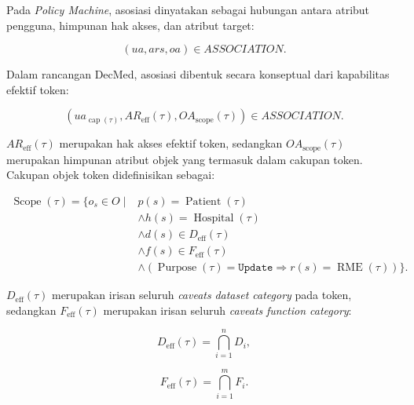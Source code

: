 \documentclass[bahasa, 12pt, a4paper, onecolumn, oneside, final]{report}
\begin{document}
Pada \textit{Policy Machine}, asosiasi dinyatakan sebagai hubungan antara atribut pengguna, himpunan hak akses, dan atribut target:

\begin{equation}
	(ua, ars, oa) \in ASSOCIATION.
\end{equation}

Dalam rancangan DecMed, asosiasi dibentuk secara konseptual dari kapabilitas efektif token:

\begin{equation}
	\left(
	ua_{\operatorname{cap}(\tau)},
	AR_{\operatorname{eff}}(\tau),
	OA_{\operatorname{scope}}(\tau)
	\right)
	\in ASSOCIATION.
\end{equation}

$AR_{\operatorname{eff}}(\tau)$ merupakan hak akses efektif token, sedangkan $OA_{\operatorname{scope}}(\tau)$ merupakan himpunan atribut objek yang termasuk dalam cakupan token. Cakupan objek token didefinisikan sebagai:

\begin{equation}
	\begin{split}
		\operatorname{Scope}(\tau)
		=
		\{ o_s \in O \mid {} &
		p(s)=\operatorname{Patient}(\tau)                                 \\
		                     & \land h(s)=\operatorname{Hospital}(\tau)   \\
		                     & \land d(s)\in D_{\operatorname{eff}}(\tau) \\
		                     & \land f(s)\in F_{\operatorname{eff}}(\tau) \\
		                     & \land
		(
		\operatorname{Purpose}(\tau)=\texttt{Update}
		\Rightarrow
		r(s)=\operatorname{RME}(\tau)
		)
		\}.
	\end{split}
\end{equation}

$D_{\operatorname{eff}}(\tau)$ merupakan irisan seluruh \textit{caveats} \textit{dataset category} pada token, sedangkan $F_{\operatorname{eff}}(\tau)$ merupakan irisan seluruh \textit{caveats} \textit{function category}:

\begin{equation}
	D_{\operatorname{eff}}(\tau)
	=
	\bigcap_{i=1}^{n} D_i,
\end{equation}

\begin{equation}
	F_{\operatorname{eff}}(\tau)
	=
	\bigcap_{i=1}^{m} F_i.
\end{equation}
\end{document}
